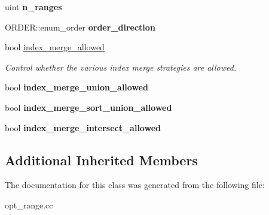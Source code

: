 \begin{DoxyCompactItemize}
\mbox{\label{classPARAM_ad844c3b64d711038d25f491aa8c9d72c}} 
uint {\bfseries n\+\_\+ranges}
\item 
\mbox{\label{classPARAM_a9bd80c41fb66640f6b83f15c8c36ae31}} 
O\+R\+D\+E\+R\+::enum\+\_\+order {\bfseries order\+\_\+direction}
\item 
\mbox{\label{classPARAM_a22941002b8671e74f5c020c0071f6667}} 
bool \mbox{\hyperlink{classPARAM_a22941002b8671e74f5c020c0071f6667}{index\+\_\+merge\+\_\+allowed}}
\begin{DoxyCompactList}\small\item\em Control whether the various index merge strategies are allowed. \end{DoxyCompactList}\item 
\mbox{\label{classPARAM_a2a3153bc72125ed4839a4385f53d5a5e}} 
bool {\bfseries index\+\_\+merge\+\_\+union\+\_\+allowed}
\item 
\mbox{\label{classPARAM_a52fa31020c6c336046644baf027957a3}} 
bool {\bfseries index\+\_\+merge\+\_\+sort\+\_\+union\+\_\+allowed}
\item 
\mbox{\label{classPARAM_ac3620e3224123de911fecfbd2bbf05d4}} 
bool {\bfseries index\+\_\+merge\+\_\+intersect\+\_\+allowed}
\end{DoxyCompactItemize}
\subsection*{Additional Inherited Members}


The documentation for this class was generated from the following file\+:\begin{DoxyCompactItemize}
\item 
opt\+\_\+range.\+cc\end{DoxyCompactItemize}
